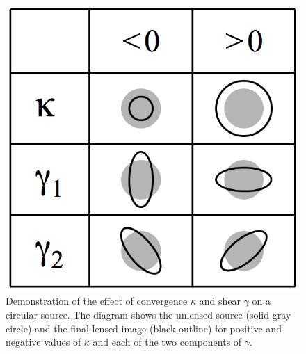 \begin{figure}
\begin{center}
\includegraphics[scale=0.3]{plots_intro/KappaGamma.png}
\caption[$\kappa$ and $\gamma$ Diagram]{Demonstration of the effect of convergence $\kappa$ and shear $\gamma$ on a circular source. The diagram shows the unlensed source (solid gray circle) and the final lensed image (black outline) for positive and negative values of $\kappa$ and each of the two components of $\gamma$.}
\label{plot:kappagamma}
\end{center}
\end{figure}

